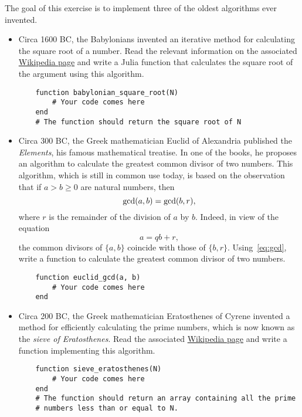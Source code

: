 \begin{task}
    The goal of this exercise is to implement three of the oldest algorithms ever invented.
    \begin{itemize}
        \item
            Circa 1600 BC, the Babylonians invented an iterative method for calculating the square root of a number.
            Read the relevant information on the associated \href{https://en.wikipedia.org/wiki/Methods_of_computing_square_roots#Babylonian_method}{Wikipedia page} and write a Julia function that
            calculates the square root of the argument using this algorithm.
    \begin{verbatim}
    function babylonian_square_root(N)
        # Your code comes here
    end
    # The function should return the square root of N
    \end{verbatim}

        \item Circa 300 BC,
            the Greek mathematician Euclid of Alexandria published the \emph{Elements},
            his famous mathematical treatise.
            In one of the books,
            he proposes an algorithm to calculate the greatest common divisor of two numbers.
            This algorithm,
            which is still in common use today,
            is based on the observation that if $a > b \geq 0$ are natural numbers,
            then 
            \begin{equation}
                \label{eq:gcd}
                {\rm gcd} (a, b) = {\rm gcd}(b, r),
            \end{equation}
            where $r$ is the remainder of the division of $a$ by $b$.
            Indeed, in view of the equation
            \[
                a = q b + r,
            \]
            the common divisors of $\{a,b\}$ coincide with those of $\{b, r\}$.
            Using~\eqref{eq:gcd},
            write a function to calculate the greatest common divisor of two numbers.
    \begin{verbatim}
    function euclid_gcd(a, b)
        # Your code comes here
    end
    \end{verbatim}

        \item Circa 200 BC,
            the Greek mathematician Eratosthenes of Cyrene invented a method for efficiently calculating the prime numbers,
            which is now known as the \emph{sieve of Eratosthenes}.
            Read the associated \href{https://en.wikipedia.org/wiki/Sieve_of_Eratosthenes}{Wikipedia page}
            and write a function implementing this algorithm.
    \begin{verbatim}
    function sieve_eratosthenes(N)
        # Your code comes here
    end
    # The function should return an array containing all the prime
    # numbers less than or equal to N.
    \end{verbatim}
    \end{itemize}
\end{task}

